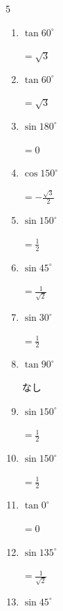 \begin{multicols}{5}
\begin{enumerate}
        $\displaystyle =-\sqrt{3}$

  \item $\displaystyle \tan{60^\circ}$

        $\displaystyle =\sqrt{3}$

  \item $\displaystyle \tan{60^\circ}$

        $\displaystyle =\sqrt{3}$

  \item $\displaystyle \sin{180^\circ}$

        $\displaystyle =0$

  \item $\displaystyle \cos{150^\circ}$

        $\displaystyle =-\frac{\sqrt{3}}{2}$

  \item $\displaystyle \sin{150^\circ}$

        $\displaystyle =\frac{1}{2}$

  \item $\displaystyle \sin{45^\circ}$

        $\displaystyle =\frac{1}{\sqrt{2}}$

  \item $\displaystyle \sin{30^\circ}$

        $\displaystyle =\frac{1}{2}$

  \item $\displaystyle \tan{90^\circ}$

        $\displaystyle なし$

  \item $\displaystyle \sin{150^\circ}$

        $\displaystyle =\frac{1}{2}$

  \item $\displaystyle \sin{150^\circ}$

        $\displaystyle =\frac{1}{2}$

  \item $\displaystyle \tan{0^\circ}$

        $\displaystyle =0$

\columnbreak %

  \item $\displaystyle \sin{135^\circ}$

        $\displaystyle =\frac{1}{\sqrt{2}}$

  \item $\displaystyle \sin{45^\circ}$


\end{enumerate}
\end{multicols}
